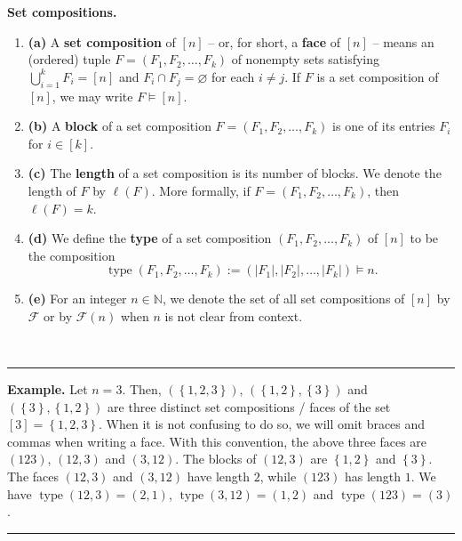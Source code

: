 \documentclass[12pt]{article}
\theoremstyle{definition}%
\theoremstyle{definition}%
\newtheorem{defn}[thm]{Definition}
\newtheorem{exmp}[thm]{Example}
\theoremstyle{remark}%
\newcommand{\tup}[1]{\left( #1 \right)}
\newcommand{\interval}[1]{\left[ #1 \right]} %
\newcommand{\set}[1]{\left\{ #1 \right\}}
\newcommand{\card}[1]{\left| #1 \right|} %
\newcommand{\NN}{\mathbb{N}}
\newcommand{\CF}{\mathcal{F}}
\newcommand{\type}{\operatorname{type}}
\newcommand{\defin}[1]{\textbf{#1}}
\newenvironment{defn}[1][Definition]{\noindent\textbf{#1.} }{\ \rule{0.5em}{0.5em}}
\newenvironment{exmp}[1][Example]{\noindent\textbf{#1.} }{\ \rule{0.5em}{0.5em}}
\begin{document}
\begin{defn}[Set compositions]
    \label{def.setcomp}\ %
    \begin{enumerate}[]
        \item\textbf{(a)} A \defin{set composition} of $\interval{n}$ -- or, for short, a \defin{face} of $\interval{n}$ -- means an (ordered) tuple $F = \tup{F_{1},F_{2},\dots,F_{k}}$ of nonempty sets satisfying $\bigcup\limits_{i=1}^k F_{i} = \interval{n}$ and $F_{i} \cap F_{j} = \varnothing$ for each $i \ne j$.
        If $F$ is a set composition of $\interval{n}$, we may write $F \models \interval{n}$.
        \item\textbf{(b)} A \defin{block} of a set composition $F=\tup{F_{1},F_{2},\dots,F_{k}}$ is one of its entries $F_{i}$ for $i \in \interval{k}$.
        \item\textbf{(c)} The \defin{length} of a set composition is its number of blocks. We denote the length of $F$ by $\ell \tup{F}$. More formally, if $F = \tup{F_{1},F_{2},\dots,F_k}$, then $\ell \tup{F}=k$.
        \item\textbf{(d)} We define the \defin{type} of a set composition $\tup{ F_{1},F_2,\dots,F_{k} }$ of $\interval{n}$ to be the composition
        \[
        \type\tup{ F_{1},F_2,\dots,F_{k} } := \tup{ \card{F_{1}},\card{F_2}, \dots, \card{F_{k}} } \models n.
        \]
        \item\textbf{(e)} For an integer $ n \in \NN $, we denote the set of all set compositions of $\interval{n}$ by $ \CF $ or by $ \CF\tup{ n } $ when $ n $ is not clear from context.
    \end{enumerate}
\end{defn}

\begin{exmp}
    Let $ n=3$. Then, $ \tup{ \set{1,2,3} }$, $\tup{ \set{1,2},\set{3} } $ and $ \tup{ \set{3},\set{1,2} } $ are three distinct set compositions / faces of the set $ \interval{3} = \set{1,2,3} $.
    When it is not confusing to do so, we will omit braces and commas when writing a face. With this convention, the above three faces are $ \tup{ 123 }$, $\tup{ 12,3 } $ and $ \tup{ 3,12 } $. The blocks of $ \tup{ 12,3 } $ are $ \set{1,2} $ and $ \set{3} $. The faces $ \tup{ 12,3 }$ and $\tup{ 3,12 } $ have length $ 2 $, while $ \tup{ 123 } $ has length $ 1 $. We have $ \type\tup{ 12,3 }=\tup{ 2,1 } $, $ \type\tup{ 3,12 }=\tup{ 1,2 } $ and $ \type\tup{ 123 }=\tup{ 3 } $.
\end{exmp}
\end{document}
